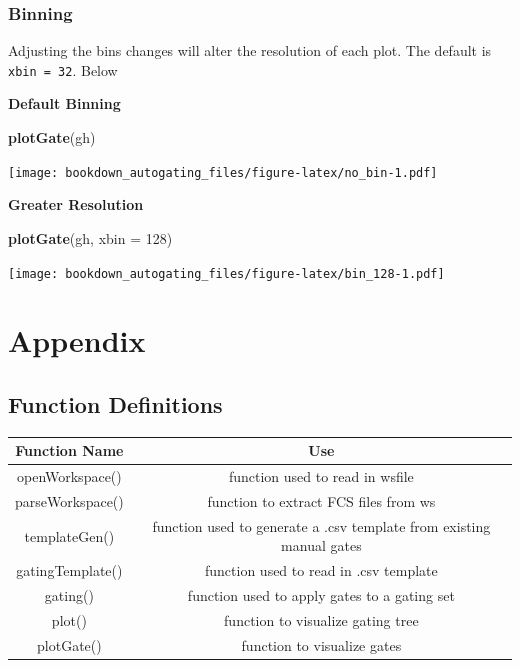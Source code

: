 \documentclass[]{book}
\newenvironment{Shaded}{\begin{snugshade}}{\end{snugshade}}
\newcommand{\DataTypeTok}[1]{\textcolor[rgb]{0.13,0.29,0.53}{#1}}
\newcommand{\DecValTok}[1]{\textcolor[rgb]{0.00,0.00,0.81}{#1}}
\newcommand{\KeywordTok}[1]{\textcolor[rgb]{0.13,0.29,0.53}{\textbf{#1}}}
\newcommand{\NormalTok}[1]{#1}
\begin{document}
\hypertarget{binning}{%
\subsection{Binning}\label{binning}}

Adjusting the bins changes will alter the resolution of each plot. The default is \texttt{xbin\ =\ 32}. Below

\textbf{Default Binning}

\begin{Shaded}
\begin{Highlighting}[]
\KeywordTok{plotGate}\NormalTok{(gh)}
\end{Highlighting}
\end{Shaded}

\texttt{[image: bookdown\_autogating\_files/figure-latex/no\_bin-1.pdf]}

\textbf{Greater Resolution}

\begin{Shaded}
\begin{Highlighting}[]
\KeywordTok{plotGate}\NormalTok{(gh, }\DataTypeTok{xbin =} \DecValTok{128}\NormalTok{)}
\end{Highlighting}
\end{Shaded}

\texttt{[image: bookdown\_autogating\_files/figure-latex/bin\_128-1.pdf]}

\hypertarget{appendix}{%
\chapter{Appendix}\label{appendix}}

\hypertarget{function-definitions}{%
\section{Function Definitions}\label{function-definitions}}

\begin{tabular}{c|c}
\hline
Function Name & Use\\
\hline
openWorkspace() & function used to read in wsfile\\
\hline
parseWorkspace() & function to extract FCS files from ws\\
\hline
templateGen() & function used to generate a .csv template from existing manual gates\\
\hline
gatingTemplate() & function used to read in .csv template\\
\hline
gating() & function used to apply gates to a gating set\\
\hline
plot() & function to visualize gating tree\\
\hline
plotGate() & function to visualize gates\\
\hline
\end{tabular}
\end{document}
